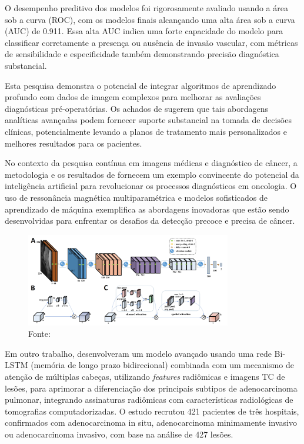 O desempenho preditivo dos modelos foi rigorosamente avaliado usando a área sob a curva (ROC), com os modelos finais alcançando uma alta área sob a curva (AUC) de 0.911. Essa alta AUC indica uma forte capacidade do modelo para classificar corretamente a presença ou ausência de invasão vascular, com métricas de sensibilidade e especificidade também demonstrando precisão diagnóstica substancial.

Esta pesquisa demonstra o potencial de integrar algoritmos de aprendizado profundo com dados de imagem complexos para melhorar as avaliações diagnósticas pré-operatórias. Os achados de \citeauthor{jiangMRIBasedRadiomics2021} sugerem que tais abordagens analíticas avançadas podem fornecer suporte substancial na tomada de decisões clínicas, potencialmente levando a planos de tratamento mais personalizados e melhores resultados para os pacientes.

No contexto da pesquisa contínua em imagens médicas e diagnóstico de câncer, a metodologia e os resultados de \citeauthor{jiangMRIBasedRadiomics2021} fornecem um exemplo convincente do potencial da inteligência artificial para revolucionar os processos diagnósticos em oncologia. O uso de ressonância magnética multiparamétrica e modelos sofisticados de aprendizado de máquina exemplifica as abordagens inovadoras que estão sendo desenvolvidas para enfrentar os desafios da detecção precoce e precisa de câncer.

\begin{figure}[htbp]
    \centering
    \includegraphics[width=0.8\textwidth]{figures/fig007.png}
    \caption{Fonte: \cite{jiangMRIBasedRadiomics2021}}
    \label{fig:fig007}
\end{figure}

Em outro trabalho, \cite{renBiLSTMMultiheadAttentionbased2023} desenvolveram um modelo avançado usando uma rede Bi-LSTM (memória de longo prazo bidirecional) combinada com um mecanismo de atenção de múltiplas cabeças, utilizando \textit{features} radiômicas e imagens TC de lesões, para aprimorar a diferenciação dos principais subtipos de adenocarcinoma pulmonar, integrando assinaturas radiômicas com características radiológicas de tomografias computadorizadas. O estudo recrutou 421 pacientes de três hospitais, confirmados com adenocarcinoma in situ, adenocarcinoma minimamente invasivo ou adenocarcinoma invasivo, com base na análise de 427 lesões.

